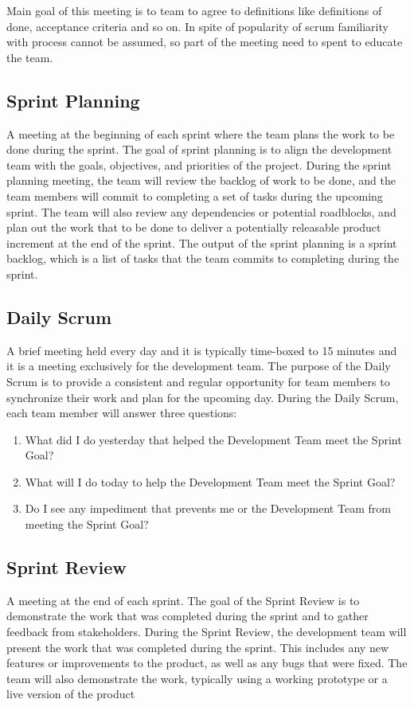 \documentclass[a4paper,12pt]{article}
\begin{document}
Main goal of this meeting is to team to agree to definitions like definitions of done, acceptance criteria and so on.
In spite of popularity of scrum familiarity with process cannot be assumed, so part of the meeting need to spent to educate the team. 



\subsection{Sprint Planning}
A meeting at the beginning of each sprint where the team plans the work to be done during the sprint.
The goal of sprint planning is to align the development team with the goals, objectives, and priorities of the project.
During the sprint planning meeting, the team will review the backlog of work to be done, and the team members will commit to completing a set of tasks during the upcoming sprint.
The team will also review any dependencies or potential roadblocks, and plan out the work that  to be done to deliver a potentially releasable product increment at the end of the sprint.
The output of the sprint planning is a sprint backlog, which is a list of tasks that the team commits to completing during the sprint.

\subsection{Daily Scrum}
A brief meeting held every day and it is typically time-boxed to 15 minutes and it is a meeting exclusively for the development team.
 The purpose of the Daily Scrum is to provide a consistent and regular opportunity for team members to synchronize their work and plan for the upcoming day.
During the Daily Scrum, each team member will answer three questions:
\begin{enumerate}
    \item What did I do yesterday that helped the Development Team meet the Sprint Goal?
    \item What will I do today to help the Development Team meet the Sprint Goal?
    \item Do I see any impediment that prevents me or the Development Team from meeting the Sprint Goal?
\end{enumerate}

\subsection{Sprint Review}
A meeting at the end of each sprint. 
 The goal of the Sprint Review is to demonstrate the work that was completed during the sprint and to gather feedback from stakeholders.
 During the Sprint Review, the development team will present the work that was completed during the sprint.
 This includes any new features or improvements to the product, as well as any bugs that were fixed.
 The team will also demonstrate the work, typically using a working prototype or a live version of the product
\end{document}

